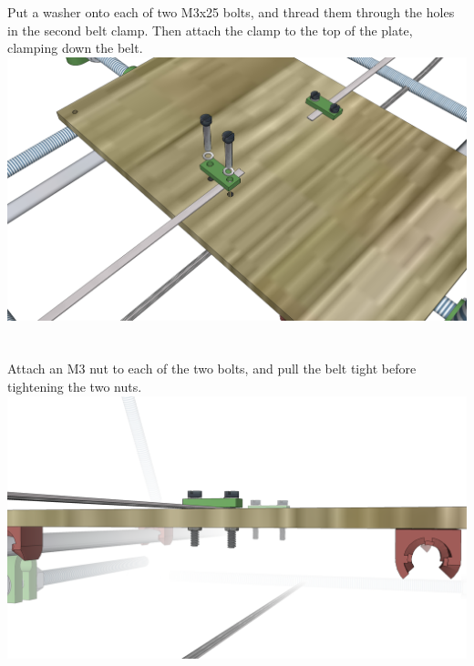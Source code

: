 \documentclass[twoside,openany,a4paper,titlepage]{memoir}
\begin{document}
	\section{}
	Put a washer onto each of two M3x25 bolts, and thread them through the holes in the second belt
	clamp. Then attach the clamp to the top of the plate, clamping down the belt.\\
	\includegraphics[width=1\linewidth]{graphics/ch6_27.png}
	
	\section{}
	Attach an M3 nut to each of the two bolts, and pull the belt tight before tightening the two nuts.\\
	\includegraphics[width=1\linewidth]{graphics/ch6_28.png}
	
\end{document}
